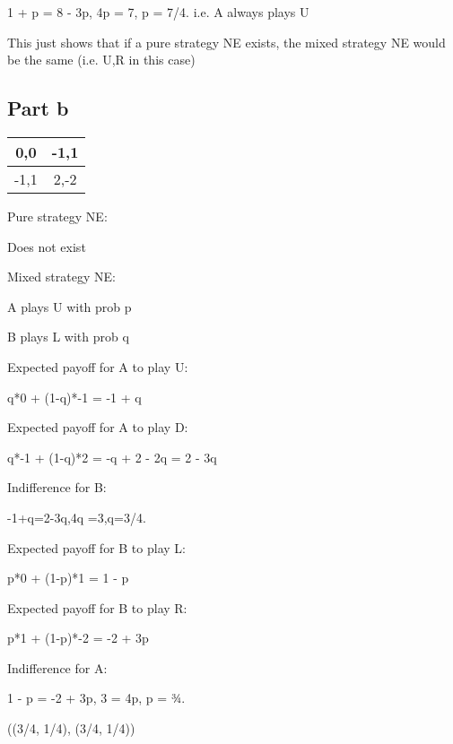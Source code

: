 \documentclass[twoside]{article}
\begin{document}
1 + p = 8 - 3p, 4p = 7, p = 7/4. i.e. A always plays U

This just shows that if a pure strategy NE exists, the mixed strategy NE would be the same (i.e. U,R in this case)

\subsection{Part b}
\begin{tabular}{ |c|c| } 
 \hline
 0,0 & -1,1 \\ 
\hline
 -1,1 & 2,-2 \\ 
 \hline
\end{tabular}

Pure strategy NE:

Does not exist

Mixed strategy NE:

A plays U with prob p

B plays L with prob q

Expected payoff for A to play U:

q*0 + (1-q)*-1 = -1 + q

Expected payoff for A to play D:

q*-1 + (1-q)*2 = -q + 2 - 2q = 2 - 3q

Indifference for B:

-1+q=2-3q,4q =3,q=3/4.

Expected payoff for B to play L:

p*0 + (1-p)*1 = 1 - p

Expected payoff for B to play R:

p*1 + (1-p)*-2 = -2 + 3p

Indifference for A:

1 - p = -2 + 3p, 3 = 4p, p = 3⁄4.

((3/4, 1/4), (3/4, 1/4))
\end{document}
